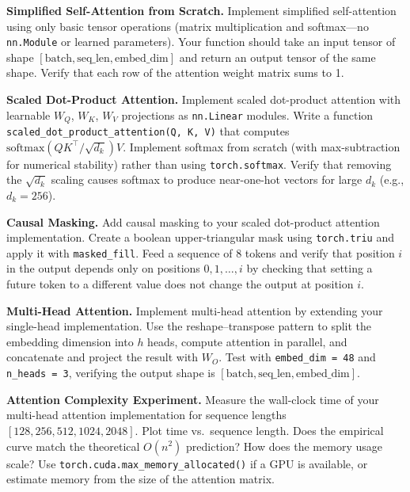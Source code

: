 \begin{problem}[1]
  \textbf{Simplified Self-Attention from Scratch.}
  Implement simplified self-attention using only basic tensor operations
  (matrix multiplication and softmax---no \texttt{nn.Module} or learned
  parameters). Your function should take an input tensor of shape
  $[\text{batch}, \text{seq\_len}, \text{embed\_dim}]$ and return an output tensor of the
  same shape. Verify that each row of the attention weight matrix sums to 1.
\end{problem}

\begin{problem}[2]
  \textbf{Scaled Dot-Product Attention.}
  Implement scaled dot-product attention with learnable $W_Q$, $W_K$, $W_V$
  projections as \texttt{nn.Linear} modules. Write a function
  \texttt{scaled\_dot\_product\_attention(Q, K, V)} that computes
  $\text{softmax}(QK^\top / \sqrt{d_k})V$. Implement softmax from scratch
  (with max-subtraction for numerical stability) rather than using
  \texttt{torch.softmax}. Verify that removing the $\sqrt{d_k}$ scaling
  causes softmax to produce near-one-hot vectors for large $d_k$ (e.g.,
  $d_k = 256$).
\end{problem}

\begin{problem}[3]
  \textbf{Causal Masking.}
  Add causal masking to your scaled dot-product attention implementation.
  Create a boolean upper-triangular mask using \texttt{torch.triu} and
  apply it with \texttt{masked\_fill}. Feed a sequence of 8 tokens and
  verify that position $i$ in the output depends only on positions
  $0, 1, \ldots, i$ by checking that setting a future token to a
  different value does not change the output at position $i$.
\end{problem}

\begin{problem}[4]
  \textbf{Multi-Head Attention.}
  Implement multi-head attention by extending your single-head
  implementation. Use the reshape--transpose pattern to split the
  embedding dimension into $h$ heads, compute attention in parallel,
  and concatenate and project the result with $W_O$. Test with
  \texttt{embed\_dim = 48} and \texttt{n\_heads = 3}, verifying the
  output shape is $[\text{batch}, \text{seq\_len}, \text{embed\_dim}]$.
\end{problem}

\begin{problem}[5]
  \textbf{Attention Complexity Experiment.}
  Measure the wall-clock time of your multi-head attention implementation
  for sequence lengths $[128, 256, 512, 1024, 2048]$. Plot time vs.\
  sequence length. Does the empirical curve match the theoretical
  $O(n^2)$ prediction? How does the memory usage scale? Use
  \texttt{torch.cuda.max\_memory\_allocated()} if a GPU is available,
  or estimate memory from the size of the attention matrix.
\end{problem}